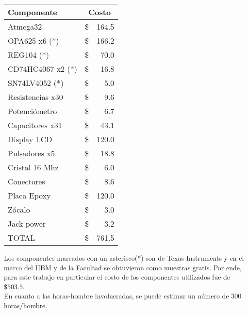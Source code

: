\begin{table}[H]
\begin{center}
\begin{tabular}{|l|rr|}
    \hline
    \textbf{Componente} & \multicolumn{2}{c|}{\textbf{Costo}} \\ \hline
    Atmega32            & \hspace{2.8cm}\$ &   164.5 \\ \hline
    OPA625 x6 (*)       & \$               &   166.2 \\ \hline
    REG104 (*)          & \$               &   70.0 \\ \hline
    CD74HC4067 x2 (*)   & \$               &   16.8 \\ \hline
    SN74LV4052 (*)      & \$               &   5.0 \\ \hline
    Resistencias x30    & \$               &   9.6 \\ \hline
    Potenciómetro       & \$               &   6.7 \\ \hline
    Capacitores x31     & \$               &   43.1 \\ \hline
    Display LCD         & \$               &   120.0 \\ \hline
    Pulsadores x5       & \$               &   18.8 \\ \hline
    Cristal 16 Mhz      & \$               &   6.0 \\ \hline 
    Conectores          & \$               &   8.6 \\ \hline       
    Placa Epoxy         & \$               &   120.0 \\ \hline
    Zócalo              & \$               &   3.0 \\ \hline
    Jack power          & \$               &   3.2 \\ \hline           
    TOTAL               & \$               &   761.5 \\ \hline
\end{tabular}
\end{center}
\end{table}

Los componentes marcados con un asterisco(*) son de Texas Instruments y en el marco del IIBM y de la Facultad se obtuvieron como muestras gratis. Por ende, para este trabajo en particular el costo de los componentes utilizados fue de $\$ 503.5$.\\

En cuanto a las horas-hombre involucradas, se puede estimar un número de 300 horas/hombre. 



